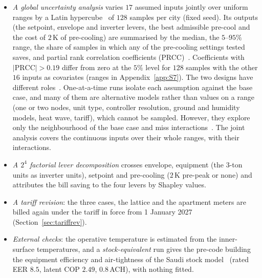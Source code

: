 \documentclass[10pt,a4paper,twocolumn]{article}
\theoremstyle{definition}
\begin{document}
\begin{itemize}[leftmargin=1.2em,itemsep=1pt,topsep=2pt]
\item \emph{A global uncertainty analysis} varies $17$ assumed inputs jointly over uniform ranges by a Latin hypercube~\citep{helton2003lhs} of $128$ samples per city (fixed seed). Its outputs (the setpoint, envelope and inverter levers, the best admissible pre-cool and the cost of $2\,$K of pre-cooling) are summarised by the median, the $5$--$95\%$ range, the share of samples in which any of the pre-cooling settings tested saves, and partial rank correlation coefficients (PRCC)~\citep{marino2008prcc}. Coefficients with $|\mathrm{PRCC}|>0.19$ differ from zero at the $5\%$ level for $128$ samples with the other $16$ inputs as covariates (ranges in Appendix~\ref{app:S7}). The two designs have different roles~\citep{tian2013review}. One-at-a-time runs isolate each assumption against the base case, and many of them are alternative models rather than values on a range (one or two nodes, unit type, controller resolution, ground and humidity models, heat wave, tariff), which cannot be sampled. However, they explore only the neighbourhood of the base case and miss interactions~\citep{saltelli2010perfunctory}. The joint analysis covers the continuous inputs over their whole ranges, with their interactions.
\item \emph{A $2^4$ factorial lever decomposition} crosses envelope, equipment (the 3-ton units as inverter units), setpoint and pre-cooling ($2\,$K pre-peak or none) and attributes the bill saving to the four levers by Shapley values.
\item \emph{A tariff revision}: the three cases, the lattice and the apartment meters are billed again under the tariff in force from 1 January 2027 (Section~\ref{sec:tariffrev}).
\item \emph{External checks}: the operative temperature is estimated from the inner-surface temperatures, and a \emph{stock-equivalent} run gives the pre-code building the equipment efficiency and air-tightness of the Saudi stock model~\citep{stockmodel2020} (rated EER $8.5$, latent COP $2.49$, $0.8\,$ACH), with nothing fitted.
\end{itemize}
\end{document}

